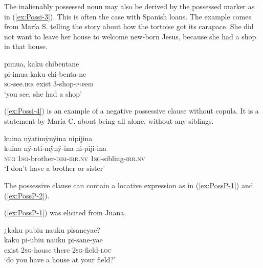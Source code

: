 The inalienably possessed noun may also be derived by the possessed marker as in (\ref{ex:Possi-3}). This is often the case with Spanish loans. The example comes from María S. telling the story about how the tortoise got its carapace. She did not want to leave her house to welcome new-born Jesus, because she had a shop in that house.

\ea\label{ex:Possi-3}
\begingl
\glpreamble pimua, kaku chibentane\\
\gla pi-imua kaku chi-benta-ne\\
\textsc{sg}-see.\textsc{irr} exist 3-shop-\textsc{possd}\\
\glft ‘you see, she had a shop’
\endgl
\trailingcitation{[rxx-n121128s.17]}
\xe



(\ref{ex:Possi-4}) is an example of a negative possessive clause without copula. It is a statement by María C. about being all alone, without any siblings.

\ea\label{ex:Possi-4}
\begingl
\glpreamble kuina nÿatimÿnÿina nipijina \\
\gla kuina nÿ-ati-mÿnÿ-ina ni-piji-ina\\
\glb \textsc{neg} 1\textsc{sg}-brother-\textsc{dim}-\textsc{irr.nv} 1\textsc{sg}-sibling-\textsc{irr.nv}\\
\glft ‘I don’t have a brother or sister’
\endgl
\trailingcitation{[uxx-p110825l.074]}
\xe

The possessive clause can contain a locative expression as in (\ref{ex:PossP-1}) and (\ref{ex:PossP-2}).

(\ref{ex:PossP-1}) was elicited from Juana.

\ea\label{ex:PossP-1}
\begingl 
\glpreamble ¿kaku pubiu nauku pisaneyae?\\
\gla kaku pi-ubiu nauku pi-sane-yae\\ 
\glb exist 2\textsc{sg}-house there 2\textsc{sg}-field-\textsc{loc}\\ 
\glft ‘do you have a house at your field?’
\trailingcitation{[jmx-e090727s.352]}
\xe

